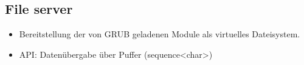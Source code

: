 \subsection{File server}





\begin{itemize}
	\item Bereitstellung der von GRUB geladenen Module als virtuelles Dateisystem.
	
	\item API: Datenübergabe über Puffer (sequence<char>)

\end{itemize}

